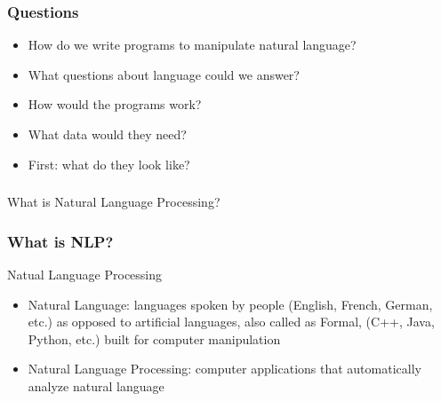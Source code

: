 \begin{frame}[fragile]\frametitle{Questions}
  \begin{itemize}
    \item How do we write programs to manipulate natural language?
    \item What questions about language could we answer?
    \item How would the programs work?
    \item What data would they need?
    \item First: what do they look like?
  \end{itemize}
\end{frame}

\begin{frame}[fragile]\frametitle{}

\begin{center}
{\Large What is Natural Language Processing?}
\end{center}
\end{frame}


%

\begin{frame}[fragile]\frametitle{What is NLP?}
Natual Language Processing
  \begin{itemize}
\item Natural Language: languages spoken by people (English, French, German, etc.) as opposed to artificial languages, also called as Formal, (C++, Java, Python, etc.) built for computer manipulation
\item Natural Language Processing: computer applications that automatically analyze natural language
  \end{itemize}
\end{frame}


